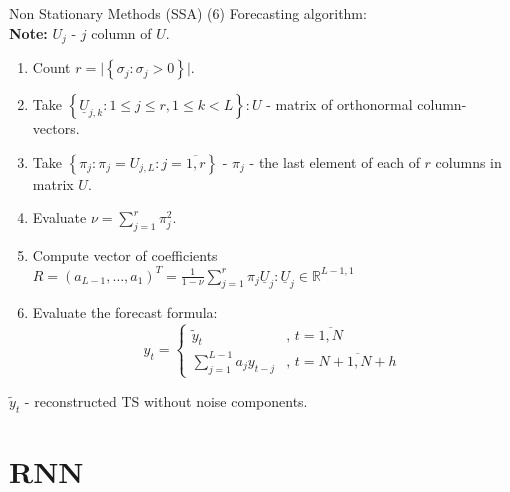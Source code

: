 \documentclass[aspectratio= 169]{beamer}
\newcommand{\R}{\mathbb{R}}
\begin{document}
			\begin{frame}{Non Stationary Methods (SSA) (6)}
				Forecasting algorithm:\\
				\textbf{Note:} ${U_j}$ - $j$ column of $U$.
				\begin{enumerate}
					\item Count ${r = \lvert \left\{\sigma_j: \sigma_j > 0 \right\} \rvert}$.
					\item Take ${\left\{ \underline{U}_{j, k} : 1 \le j \le r, 1 \le k < L \right\}: U}$ -  matrix of orthonormal column-vectors.
					\item Take ${\left\{\pi_j : \pi_j = U_{j, L}: j = \overline{1, r}\right\}}$ - ${\pi_j}$ - the last element of each of $r$ columns in matrix $U$.
					\item Evaluate $\nu = \sum_{j = 1}^r \pi_j^2$.
					\item Compute vector of coefficients ${R = \left(a_{L - 1}, \ldots, a_{1}\right)^T = \frac{1}{1 - \nu} \sum_{j = 1}^r \pi_j \underline{U}_j}: \underline{U}_j \in \R^{L-1, 1}$
					\item Evaluate the forecast formula:
					\begin{equation}
						y_t = 
						\left\{\begin{array}{ll}
							\displaystyle
							\tilde{y}_t & \text{, } t = \overline{1, N}\\
							\displaystyle
							\sum_{j = 1}^{L - 1}a_j y_{t - j} & \text{, } t = \overline{N+1, N + h}
						\end{array}\right.
					\end{equation}
				\end{enumerate}
			${\tilde{y}_t}$ - reconstructed TS without noise components.
			\end{frame}
	
	\section{RNN}
\end{document}

